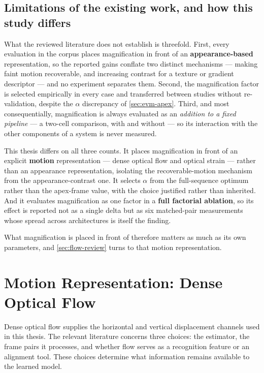 \subsection{Limitations of the existing work, and how this study differs}
\label{sec:evm-gap}

What the reviewed literature does not establish is threefold. First, every evaluation in the corpus places magnification in front of an \textbf{appearance-based} representation, so the reported gains conflate two distinct mechanisms --- making faint motion recoverable, and increasing contrast for a texture or gradient descriptor --- and no experiment separates them. Second, the magnification factor is selected empirically in every case and transferred between studies without re-validation, despite the $\alpha$ discrepancy of \autoref{sec:evm-apex}. Third, and most consequentially, magnification is always evaluated as an \textit{addition to a fixed pipeline} --- a two-cell comparison, with and without --- so its interaction with the other components of a system is never measured.

This thesis differs on all three counts. It places magnification in front of an explicit \textbf{motion} representation --- dense optical flow and optical strain --- rather than an appearance representation, isolating the recoverable-motion mechanism from the appearance-contrast one. It selects $\alpha$ from the full-sequence optimum rather than the apex-frame value, with the choice justified rather than inherited. And it evaluates magnification as one factor in a \textbf{full factorial ablation}, so its effect is reported not as a single delta but as six matched-pair measurements whose spread across architectures is itself the finding.

What magnification is placed in front of therefore matters as much as its own parameters, and \autoref{sec:flow-review} turns to that motion representation.


\section{Motion Representation: Dense Optical Flow}
\label{sec:flow-review}

Dense optical flow supplies the horizontal and vertical displacement channels used in this thesis. The relevant literature concerns three choices: the estimator, the frame pairs it processes, and whether flow serves as a recognition feature or an alignment tool. These choices determine what information remains available to the learned model.


